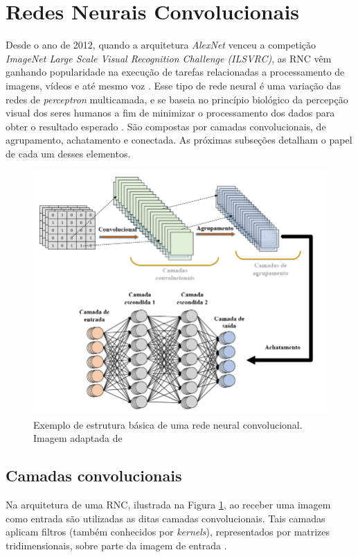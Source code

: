 \section{Redes Neurais Convolucionais}

Desde o ano de 2012, quando a arquitetura \textit{AlexNet} venceu a competição \textit{ImageNet Large Scale Visual Recognition Challenge (ILSVRC)}, as \acf{RNC} vêm ganhando popularidade na execução de tarefas relacionadas a processamento de imagens, vídeos e até mesmo voz \cite{vargas2016estudo}.
Esse tipo de rede neural é uma variação das redes de \textit{perceptron} multicamada, e se baseia no princípio biológico da percepção visual dos seres humanos a fim de minimizar o processamento dos dados para obter o resultado esperado \cite{mueller2019deep}. São compostas por camadas convolucionais, de agrupamento, achatamento e conectada. As próximas subseções detalham o papel de cada um desses elementos.

\begin{figure}[H]
  \centering
  \includegraphics[width=.8\linewidth]{figures/2_theoric_foundamentations/cnn.png}
  \caption[Estrutura básica de uma rede neural convolucional.]{Exemplo de estrutura básica de uma rede neural convolucional. Imagem adaptada de \cite{srinivasan2021durld}}
  \label{fig:cnn}
\end{figure}

\subsection{Camadas convolucionais}

Na arquitetura de uma \ac{RNC}, ilustrada na Figura \ref{fig:cnn}, ao receber uma imagem como entrada são utilizadas as ditas camadas convolucionais. Tais camadas aplicam filtros (também conhecidos por \textit{kernels}), representados por matrizes tridimensionais, sobre parte da imagem de entrada \cite{rawat2017deep}.

